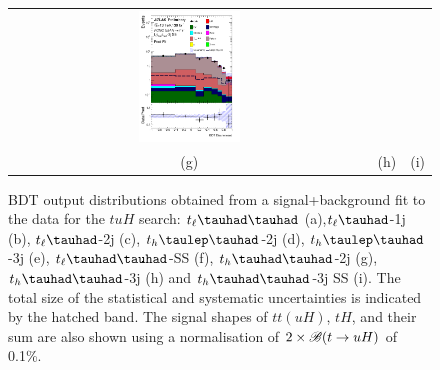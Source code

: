 \begin{figure}[H]
\begin{tabular}{@{}ccc@{}}
\includegraphics[width=0.29\textwidth]{figures/tuH_reg2mtau1b3jss.pdf}\\
(g) & (h)  & (i) \\
\end{tabular}
\caption{ BDT output distributions obtained from a signal+background fit to the data for the $tuH$ search: 
$t_{\ell}\thadhad$ (a),$t_{\ell}\tauhad$-1j (b),  $t_{\ell}\tauhad$-2j (c), $t_h\tlhad$-2j (d), $t_h\tlhad$-3j (e), $t_{\ell}\thadhad$-SS (f), $t_h\thadhad$-2j (g), $t_h\thadhad$-3j (h) and $t_h\thadhad$-3j SS (i).  
The total size of the statistical and systematic uncertainties is indicated by the hatched band. The signal shapes of $tt(uH)$, $tH$, and their sum are also shown using a normalisation of $2 \times\mathscr{B}(t\to uH)$ of 0.1\%. 
}
\label{fig:asimov_postfitbdtHu}
\end{figure}



